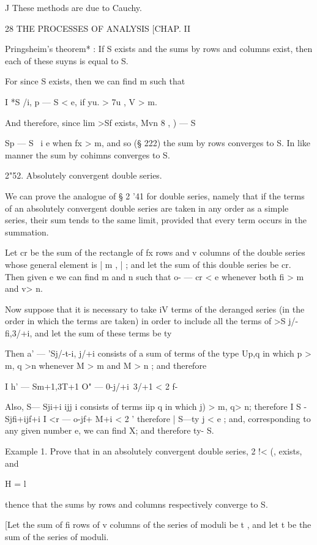 J These methods are due to Cauchy.



28 THE PROCESSES OF ANALYSIS [CHAP. II

Pringsheim's theorem* : If S exists and the sums by rows and columns
exist, then each of these suyns is equal to S.

For since S exists, then we can find m such that

I *S /i, p — S < e, if yu. > 7u , V > m.

And therefore, since lim >Sf exists, Mvn 8 , ) — S %

  Sp — S \ i e when fx > m, and so (§ 222) the sum by rows converges
to S. In like manner the sum by cohimns converges to S.

2"52. Absolutely convergent double series.

We can prove the analogue of § 2 '41 for double series, namely that if
the terms of an absolutely convergent double series are taken in any
order as a simple series, their sum tends to the same limit, provided
that every term occurs in the summation.

Let cr be the sum of the rectangle of fx rows and v columns of the
double series whose general element is | m , | ; and let the sum of
this double series be cr. Then given e we can find m and n such that
o- — cr < e whenever both fi > m and v> n.

Now suppose that it is necessary to take iV terms of the deranged
series (in the order in which the terms are taken) in order to include
all the terms of >S j/-fi,3/+i, and let the sum of these terms be ty

Then a' — 'Sj/-t-i, j/+i consists of a sum of terms of the type Up,q
in which p > m, q >n whenever M > m and M > n ; and therefore

I h' — Sm+1,3T+1 O" — 0-j/+i\ 3/+1 < 2 f-

Also, S— Sji+i ijj i consists of terms iip q in which j) > m, q> n;
therefore I S - Sjfi+ijf+i I <r — o-jf+ M+i < 2 ' therefore | S—ty j <
e ; and, corresponding to any given number e, we can find X; and
therefore ty- S.

Example 1. Prove that in an absolutely convergent double series, 2 !<
(, exists, and

H = l

thence that the sums by rows and columns respectively converge to S.

[Let the sum of fi rows of v columns of the series of moduli be t ,
and let t be the sum of the series of moduli.

